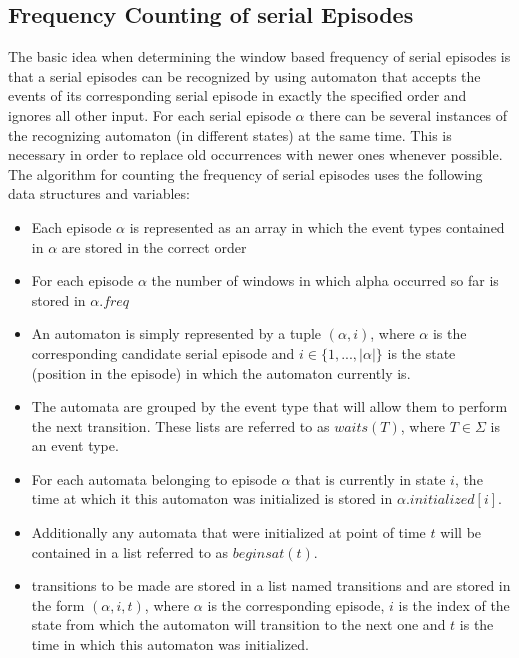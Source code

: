 \subsection{Frequency Counting of serial Episodes}
The basic idea when determining the window based frequency of serial episodes is that a serial episodes can be recognized by using automaton that accepts the events of its corresponding serial episode in exactly the specified order and ignores all other input. For each serial episode $\alpha$ there can be several instances of the recognizing automaton (in different states) at the same time. This is necessary in order to replace old occurrences with newer ones whenever possible. The algorithm for counting the frequency of serial episodes uses the following data structures and variables: %

\begin{itemize}
	 \item Each episode $\alpha$ is represented as an array in which the event types contained in $\alpha$ are stored in the correct order
	\item For each episode $\alpha$ the number of windows in which alpha occurred so far is stored in $\alpha .freq$
	\item An automaton is simply represented by a tuple $(\alpha ,i)$, where $\alpha$ is the corresponding candidate serial episode and $i \in \{1,...,|\alpha |\}$ is the state (position in the episode) in which the automaton currently is.
	\item The automata are grouped by the event type that will allow them to perform the next transition. These lists are referred to as $waits(T)$, where $T \in \Sigma$ is an event type.
	\item For each automata belonging to episode $\alpha$ that is currently in state $i$, the time at which it this automaton was initialized is stored in $\alpha .initialized[i]$.
	\item Additionally any automata that were initialized at point of time $t$ will be contained in a list referred to as $beginsat(t)$.
	\item transitions to be made are stored in a list named transitions and are stored in the form $(\alpha ,i,t)$, where $\alpha$ is the corresponding episode, $i$ is the index of the state from which the automaton will transition to the next one and $t$ is the time in which this automaton was initialized.
\end{itemize}

